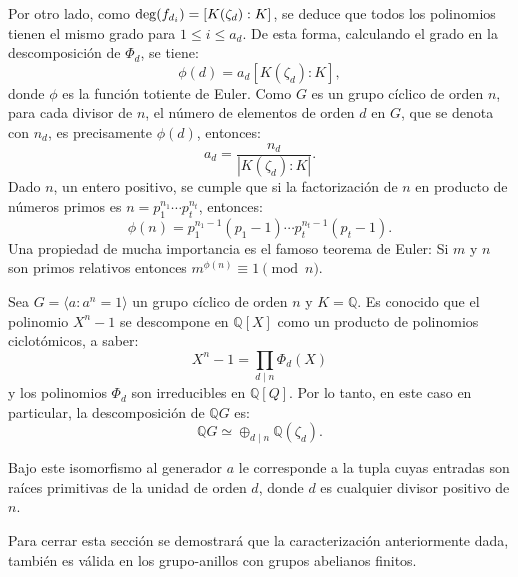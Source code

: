 Por otro lado, como $\operatorname{deg}(f_{d_i}) = [K(\zeta_d):K]$, se deduce que todos los polinomios tienen el mismo grado para $1 \leq i \leq a_d$. De esta forma, calculando el grado en la descomposición de $\Phi_d$, se tiene:
\[ \phi(d) = a_d[K(\zeta_d):K], \]
donde $\phi$ es la función totiente de Euler. Como $G$ es un grupo cíclico de orden $n$, para cada divisor de $n$, el número de elementos de orden $d$ en $G$, que se denota con $n_d$, es precisamente $\phi(d)$, entonces:
\[ a_d = \frac{n_d}{| K(\zeta_d) : K|}.  \]
\indent Dado $n$, un entero positivo, se cumple que si la factorización de $n$ en producto de números primos es $n = p_1^{n_1}\cdots p_t^{n_t}$, entonces: \[ \phi(n) = p_1^{n_1-1}(p_1-1)\cdots p_t^{n_t-1}(p_t-1).  \]
\indent Una propiedad de mucha importancia es el famoso teorema de Euler: Si $m$ y $n$ son primos relativos entonces $m^{\phi(n)} \equiv 1 \pmod{n}.$
\begin{ejemplo}\label{ejem:descomposicionRacional}
Sea $G = \langle a: a^n = 1 \rangle$  un grupo cíclico de orden $n$ y $K = \mathds{Q} $. Es conocido que el polinomio $X^n-1$ se descompone en $\mathds{Q}[X]$ como un producto de polinomios ciclotómicos, a saber:
\[ X^n -1 = \prod_{d \mid n}\Phi_d(X)  \]
y los polinomios $\Phi_d$ son irreducibles en $\mathds{Q}[Q]$. Por lo tanto, en este caso en particular, la descomposición de $\mathds{Q}G$ es:
\[ \mathds{Q}G \simeq \oplus_{d\mid n} \mathds{Q}(\zeta_d).  \]

Bajo este isomorfismo al generador $a$ le corresponde a la tupla cuyas entradas son raíces primitivas de la unidad de orden $d$, donde $d$ es cualquier divisor positivo de $n$. 
\end{ejemplo}

Para cerrar esta sección se demostrará que la caracterización anteriormente dada,  también es válida en los grupo-anillos con grupos  abelianos finitos.

